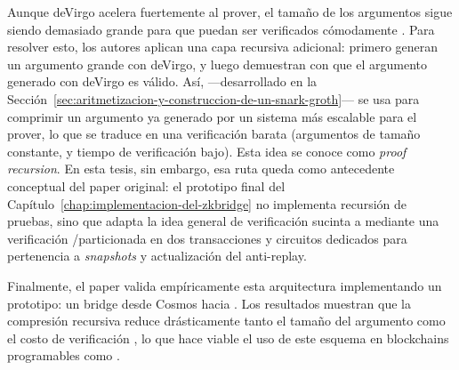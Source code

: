 Aunque deVirgo acelera fuertemente al prover, el tamaño de los argumentos sigue siendo demasiado grande para que puedan ser verificados cómodamente \Onchain. Para resolver esto, los autores aplican una capa recursiva adicional: primero generan un argumento grande con deVirgo, y luego demuestran con \Groth que el argumento generado con deVirgo es válido. Así, \Groth ---desarrollado en la Sección~\ref{sec:aritmetizacion-y-construccion-de-un-snark-groth}--- se usa para comprimir un argumento ya generado por un sistema más escalable para el prover, lo que se traduce en una verificación \Onchain barata (argumentos de tamaño constante, y tiempo de verificación bajo). Esta idea se conoce como \emph{proof recursion}. En esta tesis, sin embargo, esa ruta queda como antecedente conceptual del paper original: el prototipo final del Capítulo~\ref{chap:implementacion-del-zkbridge} no implementa recursión de pruebas, sino que adapta la idea general de verificación sucinta a \Cardano mediante una verificación \STM \HaloTwo/\Midnight particionada en dos transacciones y circuitos \Groth dedicados para pertenencia a \textit{snapshots} y actualización del \SMT anti-replay.

Finalmente, el paper valida empíricamente esta arquitectura implementando un prototipo: un bridge desde Cosmos hacia \Ethereum. Los resultados muestran que la compresión recursiva reduce drásticamente tanto el tamaño del argumento como el costo de verificación \Onchain, lo que hace viable el uso de este esquema en blockchains programables como \Ethereum.
